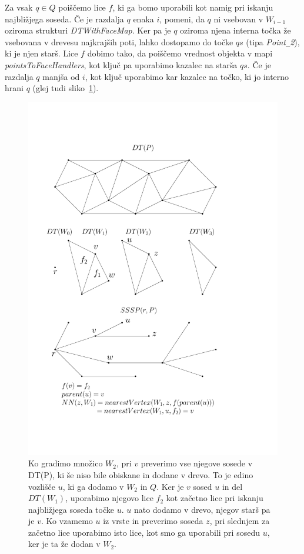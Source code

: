 \documentclass[a4paper, 12pt]{book}
\newcommand{\U}{\texttt{\_}}
\begin{document}
Za vsak $q\in Q$ poiščemo lice $f$, ki ga bomo uporabili kot namig pri iskanju najbližjega soseda. Če je razdalja $q$ enaka $i$, pomeni, da $q$ ni vsebovan v $W_{i-1}$ oziroma strukturi \textit{DTWithFaceMap}. Ker pa je $q$ oziroma njena interna točka že vsebovana v drevesu najkrajših poti, lahko dostopamo do točke $qs$ (tipa \textit{Point\U 2}), ki je njen starš.  Lice $f$ dobimo tako, da poiščemo vrednost objekta v mapi \textit{pointsToFaceHandlers}, kot ključ pa uporabimo kazalec na starša $qs$. Če je razdalja $q$ manjša od $i$, kot ključ uporabimo kar kazalec na točko, ki jo interno hrani $q$ (glej tudi sliko~\ref{pointsToFace}).

\begin{figure}[htp]
\centerline{\includegraphics[scale=0.6]{pics/pointsToFaceHandlers-all.pdf}}
\caption{Ko gradimo množico $W_2$, pri $v$ preverimo vse njegove sosede v DT(P), ki še niso bile obiskane in dodane v drevo. To je edino vozlišče $u$, ki ga dodamo v $W_2$ in $Q$. Ker je $v$ sosed $u$ in del $DT(W_1)$, uporabimo njegovo lice $f_2$ kot začetno lice pri iskanju najbližjega soseda točke $u$. $u$ nato dodamo v drevo, njegov starš pa je $v$. Ko vzamemo $u$ iz vrste in preverimo soseda $z$, pri slednjem za začetno lice uporabimo isto lice, kot smo ga uporabili pri sosedu $u$, ker je ta že dodan v $W_2$.}
\label{pointsToFace}
\end{figure}  
\end{document}
